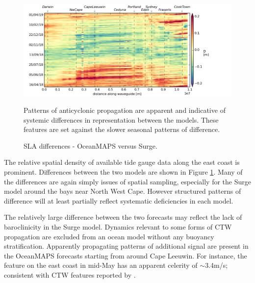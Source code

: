 \begin{figure}[!hbt] \centering
    \includegraphics[width=\figwidthFull]{figures/plots/interpRdiff_sla_surgeg_day0.png}
    \caption{SLA differences - OceanMAPS versus Surge.}
    {Patterns of anticyclonic propagation are apparent and indicative of systemic differences in representation between the models. These features are set against the slower seasonal patterns of difference.}
    \label{fig:diff_omaps_surge}
\end{figure}
The relative spatial density of available tide gauge data along the east coast is prominent.
Differences between the two models are shown in Figure \ref{fig:diff_omaps_surge}. 
Many of the differences are again simply issues of spatial sampling, especially for the Surge model around the bays near North West Cape.
However structured patterns of difference will at least partially reflect systematic deficiencies in each model.

The relatively large difference between the two forecasts may reflect the lack of baroclinicity in the Surge model.
Dynamics relevant to some forms of CTW propagation are excluded from an ocean model without any buoyancy stratification.   
Apparently propagating patterns of additional signal are present in the OceanMAPS forecasts starting from around Cape Leeuwin.
For instance, the feature on the east coast in mid-May has an apparent celerity of $\sim$3.4m/s; consistent with CTW features reported by \citet{Woodham:2013cl}.


